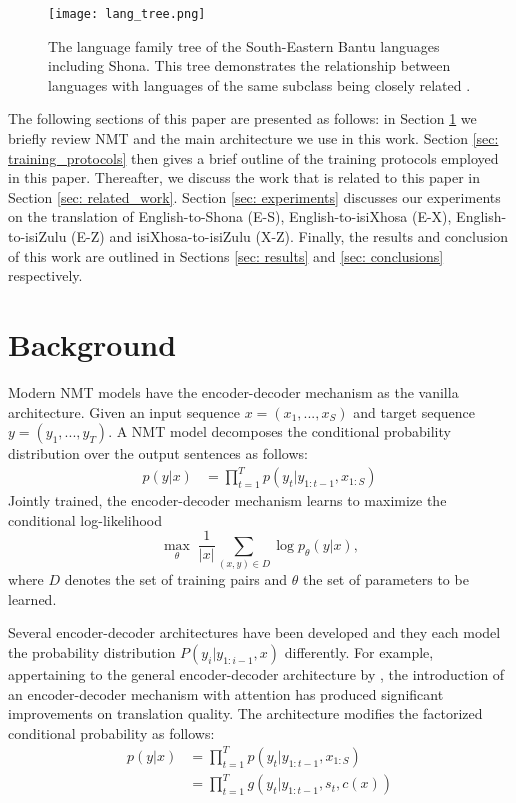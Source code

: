 \documentclass[11pt,a4paper]{article}
\begin{document}
\begin{figure*}[!htbp]
    \centering
    \texttt{[image: lang\_tree.png]}
    \caption{The language family tree of the South-Eastern Bantu languages including Shona. This tree demonstrates the relationship between languages with languages of the same subclass being closely related \cite{doke2014english}.}
    \label{fig: lang_fam_tree}
\end{figure*}

\indent The following sections of this paper are presented as follows: in Section \ref{sec: background} we briefly review NMT and the main architecture we use in this work. Section \ref{sec: training_protocols} then gives a brief outline of the training protocols employed in this paper. Thereafter, we discuss the work that is related to this paper in Section \ref{sec: related_work}. Section \ref{sec: experiments} discusses our experiments on the translation of English-to-Shona (E-S), English-to-isiXhosa (E-X), English-to-isiZulu (E-Z) and isiXhosa-to-isiZulu (X-Z). Finally, the results and conclusion of this work are outlined in Sections \ref{sec: results} and \ref{sec: conclusions} respectively.

\section{Background}\label{sec: background}
Modern NMT models have the encoder-decoder mechanism \cite{sutskever2014sequence} as the vanilla architecture. Given an input sequence $x=(x_{1},...,x_{S})$ and target sequence $y=(y_{1},...,y_{T})$. A NMT model decomposes the conditional probability distribution over the output sentences as follows: 
\begin{equation}
\begin{split}
    p(y|x) &= \prod^{T}_{t=1} p(y_{t}|y_{1:t-1},x_{1:S})
\end{split}
\end{equation}
Jointly trained, the encoder-decoder mechanism learns to maximize the conditional log-likelihood
\begin{equation}\label{eq: enc_dec_logL}
    \max_{\theta}\;\frac{1}{|x|}\sum_{(x,y)\in D} \log p_{\theta}(y|x),
\end{equation}
where $D$ denotes the set of training pairs and $\theta$ the set of parameters to be learned.


Several encoder-decoder architectures have been developed and they each model the probability distribution $P(y_{i}|y_{1:i-1}, x)$ differently. For example, appertaining to the general encoder-decoder architecture by \citet{sutskever2014sequence}, the introduction of an encoder-decoder mechanism with attention \cite{bahdanau2014neural} has produced significant improvements on translation quality. The \citet{bahdanau2014neural} architecture modifies the factorized conditional probability as follows:
\begin{equation}
\begin{split}
    p(y|x) &= \prod^{T}_{t=1} p(y_{t}|y_{1:t-1},x_{1:S}) \\
    &= \prod^{T}_{t=1}g(y_{t}|y_{1:t-1},s_{t},c(x))
\end{split}
\end{equation}
\end{document}

